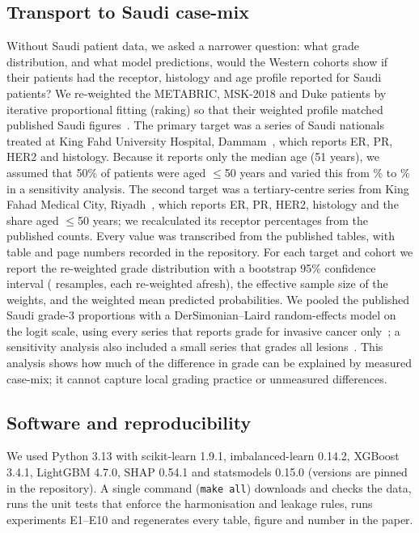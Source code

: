 \subsection{Transport to Saudi case-mix}\label{sec:transport}
Without Saudi patient data, we asked a narrower question: what grade distribution, and what model
predictions, would the Western cohorts show if their patients had the receptor, histology and age
profile reported for Saudi patients? We re-weighted the METABRIC, MSK-2018 and Duke patients by
iterative proportional fitting (raking) so that their weighted profile matched published Saudi
figures~\citep{steingrimsson2023transport}. The primary target was a series of Saudi nationals
treated at King Fahd University Hospital, Dammam~\citep{kussaibi2021saudi}, which reports ER, PR,
HER2 and histology. Because it reports only the median age (51 years), we assumed that 50\% of
patients were aged $\le$50 years and varied this from \AgeSensLo\% to \AgeSensHi\% in a sensitivity
analysis. The second target was a tertiary-centre series from King Fahad Medical City,
Riyadh~\citep{durrani2025healthcare}, which reports ER, PR, HER2, histology and the share aged
$\le$50 years; we recalculated its receptor percentages from the published counts. Every value was
transcribed from the published tables, with table and page numbers recorded in the repository.
For each target and cohort we report the re-weighted grade distribution with a bootstrap 95\%
confidence interval (\TransportBoot{} resamples, each re-weighted afresh), the effective sample size
of the weights, and the weighted mean predicted probabilities. We pooled the published Saudi grade-3
proportions with a DerSimonian--Laird random-effects model on the logit scale, using every series that
reports grade for invasive cancer only~\citep{kussaibi2021saudi,durrani2025healthcare,albasri2014madinah};
a sensitivity analysis also included a small series that grades all lesions~\citep{alamri2024najran}.
This analysis shows how much of the difference in grade can be explained by measured case-mix; it
cannot capture local grading practice or unmeasured differences.

\subsection{Software and reproducibility}
We used Python 3.13 with scikit-learn 1.9.1, imbalanced-learn 0.14.2, XGBoost 3.4.1, LightGBM 4.7.0,
SHAP 0.54.1 and statsmodels 0.15.0 (versions are pinned in the repository). A single command
(\texttt{make all}) downloads and checks the data, runs the unit tests that enforce the harmonisation
and leakage rules, runs experiments E1--E10 and regenerates every table, figure and number in the
paper.
